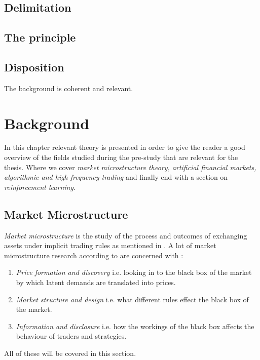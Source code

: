 \documentclass{kththesis}
\theoremstyle{definition}
\begin{document}
\section{Delimitation}

\section{The principle}

\section{Disposition}


The background is coherent and relevant.
\chapter{Background}
In this chapter relevant theory is presented in order to give the reader a good overview of the fields studied during the pre-study that are relevant for the thesis. Where we cover \textit{market microstructure theory, artificial financial markets, algorithmic and high frequency trading} and finally end with a section on \textit{reinforcement learning}.





\section{Market Microstructure}
\textit{Market microstructure} is the study of the process and outcomes of exchanging assets under implicit trading rules as mentioned in \textcite{o1995market}. A lot of market microstructure research according to \textcite{madhavan2000market} are concerned with : 
\begin{enumerate}
    \item \textit{Price formation and discovery} i.e. looking in to the black box of the market by which latent demands are translated into prices.
    \item \textit{Market structure and design} i.e. what different rules effect the black box of the market.
    \item \textit{Information and disclosure} i.e. how the workings of the black box affects the behaviour of traders and strategies.
\end{enumerate}
All of these will be covered in this section.
\end{document}
